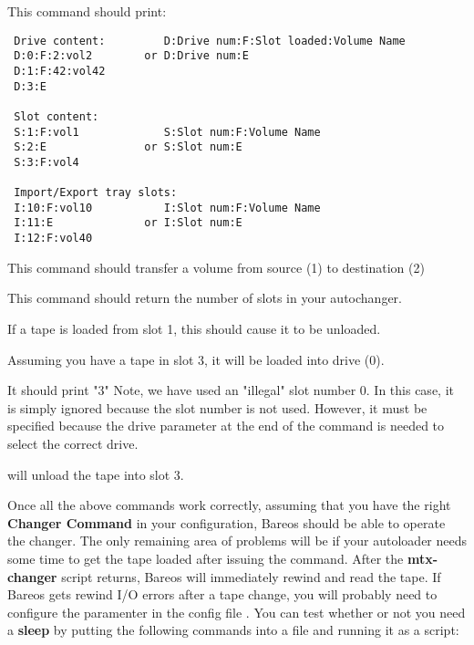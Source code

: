 
This command should print:

\footnotesize
\begin{verbatim}
 Drive content:         D:Drive num:F:Slot loaded:Volume Name
 D:0:F:2:vol2        or D:Drive num:E
 D:1:F:42:vol42
 D:3:E

 Slot content:
 S:1:F:vol1             S:Slot num:F:Volume Name
 S:2:E               or S:Slot num:E
 S:3:F:vol4

 Import/Export tray slots:
 I:10:F:vol10           I:Slot num:F:Volume Name
 I:11:E              or I:Slot num:E
 I:12:F:vol40

\end{verbatim}
\normalsize


This command should transfer a volume from source (1) to destination (2)


This command should return the number of slots in your autochanger.


   If a tape is loaded from slot 1, this should cause it to be unloaded.


Assuming you have a tape in slot 3,  it will be loaded into drive (0).



It should print "3"
Note, we have used an "illegal" slot number 0. In this case, it is simply
ignored because the slot number is not used.  However, it must be specified
because the drive parameter at the end of the command is needed to select
the correct drive.


will unload the tape into slot 3.


Once all the above commands work correctly, assuming that you have the right
{\bf Changer Command} in your configuration, Bareos should be able to operate
the changer. The only remaining area of problems will be if your autoloader
needs some time to get the tape loaded after issuing the command. After the
{\bf mtx-changer} script returns, Bareos will immediately rewind and read the
tape. If Bareos gets rewind I/O errors after a tape change, you will probably
need to configure the  paramenter in the config file .
You can test whether or not you need a {\bf sleep} by putting the following
commands into a file and running it as a script:

